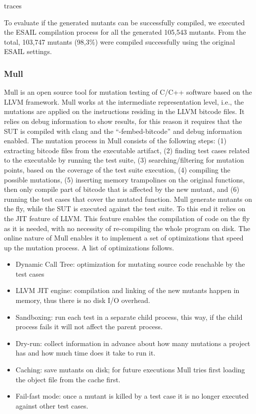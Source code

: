 traces

To evaluate if the generated mutants can be successfully compiled, we executed the ESAIL compilation process for all the generated 105,543 mutants. From the total, 103,747 mutants (98,3\%) were compiled successfully using the original ESAIL settings.

\subsubsection{Mull}

Mull is an open source tool for mutation testing of C/C++ software based on the LLVM framework. Mull works at the intermediate representation level, i.e., the mutations are applied on the instructions residing in the LLVM bitcode files. It relies on debug information to show results, for this reason it requires that the SUT is compiled with clang and the “-fembed-bitcode” and debug information enabled.
The mutation process in Mull consists of the following steps: (1) extracting bitcode files from the executable artifact, (2) finding test cases related to the executable by running the test suite, (3) searching/filtering for mutation points, based on the coverage of the test suite execution, (4) compiling the possible mutations, (5) inserting memory trampolines on the original functions, then only compile part of bitcode that is affected by the new mutant, and (6) running the test cases that cover the mutated function.
Mull generate mutants on the fly, while the SUT is executed against the test suite. To this end it relies on the JIT feature of LLVM. This feature enables the compilation of code on the fly as it is needed, with no necessity of re-compiling the whole program on disk. The online nature of Mull enables it to implement a set of optimizations that speed up the mutation process. A list of optimizations follows.

\begin{itemize}
	\item Dynamic Call Tree: optimization for mutating source code reachable by the test cases
	\item LLVM JIT engine: compilation and linking of the new mutants happen in memory, thus there is no disk I/O overhead.
	\item Sandboxing: run each test in a separate child process, this way, if the child process fails it will not affect the parent process.
	\item Dry-run: collect information in advance about how many mutations a project has and how much time does it take to run it.
	\item Caching: save mutants on disk; for future executions Mull tries first loading the object file from the cache first.
	\item Fail-fast mode: once a mutant is killed by a test case it is no longer executed against other test cases.
\end{itemize}

